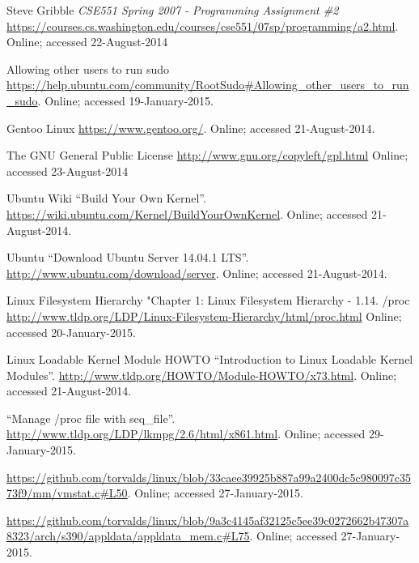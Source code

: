 \documentclass[11pt]{article}
\begin{document}
\begin{thebibliography}{3}

 Steve Gribble
	\newblock \emph{CSE551 Spring 2007 - Programming Assignment \#2}
	\newblock \url{https://courses.cs.washington.edu/courses/cse551/07sp/programming/a2.html}.
	\newblock Online; accessed 22-August-2014 

 Allowing other users to run sudo
	\newblock \url{https://help.ubuntu.com/community/RootSudo#Allowing_other_users_to_run_sudo}.
	\newblock Online; accessed 19-January-2015.	
	
 Gentoo Linux
	\newblock \url{https://www.gentoo.org/}.
	\newblock Online; accessed 21-August-2014.	
	
 The GNU General Public License
	\newblock \url{http://www.gnu.org/copyleft/gpl.html}
	\newblock Online; accessed 23-August-2014 


 Ubuntu Wiki
  \newblock ``Build Your Own Kernel''.
  \newblock
  \url{https://wiki.ubuntu.com/Kernel/BuildYourOwnKernel}.
  \newblock Online; accessed 21-August-2014.
  
 Ubuntu
  \newblock ``Download Ubuntu Server 14.04.1 LTS''.
  \newblock
  \url{ http://www.ubuntu.com/download/server}.
  \newblock Online; accessed 21-August-2014.
  
 Linux Filesystem Hierarchy
  \newblock "Chapter 1: Linux Filesystem Hierarchy - 1.14. /proc
  \newblock \url{http://www.tldp.org/LDP/Linux-Filesystem-Hierarchy/html/proc.html}
  \newblock Online; accessed 20-January-2015.  
  
 Linux Loadable Kernel Module HOWTO
  \newblock ``Introduction to Linux Loadable Kernel Modules''.
  \newblock
  \url{http://www.tldp.org/HOWTO/Module-HOWTO/x73.html}.
  \newblock Online; accessed 21-August-2014.

  \newblock ``Manage /proc file with seq\_file''.
  \newblock
  \url{http://www.tldp.org/LDP/lkmpg/2.6/html/x861.html}.
  \newblock Online; accessed 29-January-2015.

  \url{https://github.com/torvalds/linux/blob/33caee39925b887a99a2400dc5c980097c3573f9/mm/vmstat.c#L50}.
  \newblock Online; accessed 27-January-2015.

  \url{https://github.com/torvalds/linux/blob/9a3c4145af32125c5ee39c0272662b47307a8323/arch/s390/appldata/appldata_mem.c#L75}.
  \newblock Online; accessed 27-January-2015.

\end{thebibliography}
\end{document}
